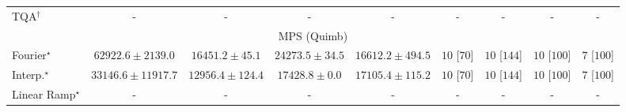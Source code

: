 \begin{tabular}{l|cccc|cccc|}
TQA$^\dagger$ & {\cellcolor[HTML]{000000}} \color[HTML]{F1F1F1} {\cellcolor{white}} \color{black} - & {\cellcolor[HTML]{000000}} \color[HTML]{F1F1F1} {\cellcolor{white}} \color{black} - & {\cellcolor[HTML]{000000}} \color[HTML]{F1F1F1} {\cellcolor{white}} \color{black} - & {\cellcolor[HTML]{000000}} \color[HTML]{F1F1F1} {\cellcolor{white}} \color{black} - & {\cellcolor[HTML]{000000}} \color[HTML]{F1F1F1} {\cellcolor{white}} \color{black} - & {\cellcolor[HTML]{000000}} \color[HTML]{F1F1F1} {\cellcolor{white}} \color{black} - & {\cellcolor[HTML]{000000}} \color[HTML]{F1F1F1} {\cellcolor{white}} \color{black} - & {\cellcolor[HTML]{000000}} \color[HTML]{F1F1F1} {\cellcolor{white}} \color{black} - \\
\cline{1-9}
\multicolumn{9}{c}{\rule{0pt}{8pt}MPS (Quimb)} \\
\midrule
Fourier$^\star$ & {\cellcolor[HTML]{9E3604}} \color[HTML]{F1F1F1} $62922.6\pm 2139.0$ & {\cellcolor[HTML]{FFFBD2}} \color[HTML]{000000} $16451.2\pm 45.1$ & {\cellcolor[HTML]{FEECA4}} \color[HTML]{000000} $24273.5\pm 34.5$ & {\cellcolor[HTML]{FFFBD0}} \color[HTML]{000000} $16612.2\pm 494.5$ & {\cellcolor[HTML]{49006A}} \color[HTML]{F1F1F1} $10$ [$70$] & {\cellcolor[HTML]{49006A}} \color[HTML]{F1F1F1} $10$ [$144$] & {\cellcolor[HTML]{49006A}} \color[HTML]{F1F1F1} $10$ [$100$] & {\cellcolor[HTML]{CD238F}} \color[HTML]{F1F1F1} $7$ [$100$] \\
Interp.$^\star$ & {\cellcolor[HTML]{FECA5D}} \color[HTML]{000000} $33146.6\pm 11917.7$ & {\cellcolor[HTML]{FFFFE5}} \color[HTML]{000000} $12956.4\pm 124.4$ & {\cellcolor[HTML]{FFFACD}} \color[HTML]{000000} $17428.8\pm 0.0$ & {\cellcolor[HTML]{FFFACE}} \color[HTML]{000000} $17105.4\pm 115.2$ & {\cellcolor[HTML]{49006A}} \color[HTML]{F1F1F1} $10$ [$70$] & {\cellcolor[HTML]{49006A}} \color[HTML]{F1F1F1} $10$ [$144$] & {\cellcolor[HTML]{49006A}} \color[HTML]{F1F1F1} $10$ [$100$] & {\cellcolor[HTML]{CD238F}} \color[HTML]{F1F1F1} $7$ [$100$] \\
Linear Ramp$^\star$ & {\cellcolor[HTML]{000000}} \color[HTML]{F1F1F1} {\cellcolor{white}} \color{black} - & {\cellcolor[HTML]{000000}} \color[HTML]{F1F1F1} {\cellcolor{white}} \color{black} - & {\cellcolor[HTML]{000000}} \color[HTML]{F1F1F1} {\cellcolor{white}} \color{black} - & {\cellcolor[HTML]{000000}} \color[HTML]{F1F1F1} {\cellcolor{white}} \color{black} - & {\cellcolor[HTML]{000000}} \color[HTML]{F1F1F1} {\cellcolor{white}} \color{black} - & {\cellcolor[HTML]{000000}} \color[HTML]{F1F1F1} {\cellcolor{white}} \color{black} - & {\cellcolor[HTML]{000000}} \color[HTML]{F1F1F1} {\cellcolor{white}} \color{black} - & {\cellcolor[HTML]{000000}} \color[HTML]{F1F1F1} {\cellcolor{white}} \color{black} - \\

\end{tabular}
